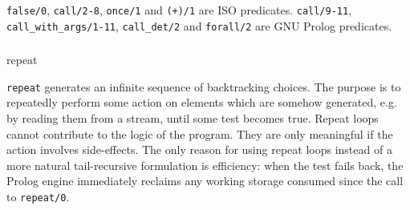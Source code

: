 \begin{PlErrors}








\end{PlErrors}

\Portability

\texttt{false/0}, \texttt{call/2-8}, \texttt{once/1} and \texttt{({\bs}+)/1}
are ISO predicates. \texttt{call/9-11}, \texttt{call\_with\_args/1-11},
\texttt{call\_det/2} and \texttt{forall/2} are GNU Prolog predicates.

\subsubsection{}

\begin{TemplatesOneCol}
repeat

\end{TemplatesOneCol}

\Description

\texttt{repeat} generates an infinite sequence of backtracking choices. The
purpose is to repeatedly perform some action on elements which are somehow
generated, e.g. by reading them from a stream, until some test becomes true.
Repeat loops cannot contribute to the logic of the program. They are only
meaningful if the action involves side-effects. The only reason for using
repeat loops instead of a more natural tail-recursive formulation is
efficiency: when the test fails back, the Prolog engine immediately reclaims
any working storage consumed since the call to \texttt{repeat/0}.

